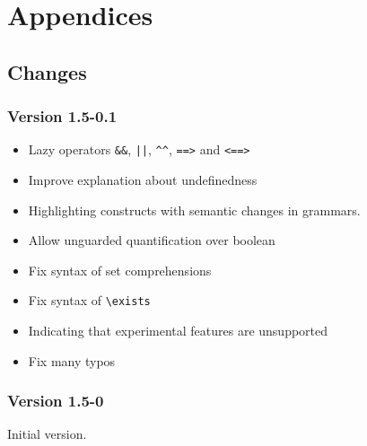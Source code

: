 \documentclass[a4paper,web]{frama-c-book}
\begin{document}








\appendix

\chapter{Appendices}
\label{chap:appendix}


%

%

%

\section{Changes}

\subsection{Version 1.5-0.1}

\begin{itemize}
\item Lazy operators \lstinline|&&|, \lstinline+||+, \lstinline|^^|,
  \lstinline|==>| and \lstinline|<==>|
\item Improve explanation about undefinedness
\item Highlighting constructs with semantic changes in grammars.
\item Allow unguarded quantification over boolean
\item Fix syntax of set comprehensions
\item Fix syntax of \lstinline|\exists|
\item Indicating that experimental \acsl features are unsupported
\item Fix many typos
\end{itemize}

\subsection{Version 1.5-0}

Initial version.

\cleardoublepage
{}



\cleardoublepage
{}
\listoffigures

\cleardoublepage
{}
\printindex
\end{document}
